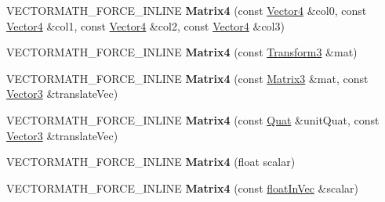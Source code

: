\begin{DoxyCompactItemize}
\item 
\hypertarget{class_vectormath_1_1_aos_1_1_matrix4_af3386f64d6e060f56a9cc5597d634f83}{V\+E\+C\+T\+O\+R\+M\+A\+T\+H\+\_\+\+F\+O\+R\+C\+E\+\_\+\+I\+N\+L\+I\+N\+E {\bfseries Matrix4} (const \hyperlink{class_vectormath_1_1_aos_1_1_vector4}{Vector4} \&col0, const \hyperlink{class_vectormath_1_1_aos_1_1_vector4}{Vector4} \&col1, const \hyperlink{class_vectormath_1_1_aos_1_1_vector4}{Vector4} \&col2, const \hyperlink{class_vectormath_1_1_aos_1_1_vector4}{Vector4} \&col3)}\label{class_vectormath_1_1_aos_1_1_matrix4_af3386f64d6e060f56a9cc5597d634f83}

\item 
\hypertarget{class_vectormath_1_1_aos_1_1_matrix4_a155dbd37559971bfcd30124bf5b66b5b}{V\+E\+C\+T\+O\+R\+M\+A\+T\+H\+\_\+\+F\+O\+R\+C\+E\+\_\+\+I\+N\+L\+I\+N\+E {\bfseries Matrix4} (const \hyperlink{class_vectormath_1_1_aos_1_1_transform3}{Transform3} \&mat)}\label{class_vectormath_1_1_aos_1_1_matrix4_a155dbd37559971bfcd30124bf5b66b5b}

\item 
\hypertarget{class_vectormath_1_1_aos_1_1_matrix4_a136146577c4e69585bde9e17fd7739fd}{V\+E\+C\+T\+O\+R\+M\+A\+T\+H\+\_\+\+F\+O\+R\+C\+E\+\_\+\+I\+N\+L\+I\+N\+E {\bfseries Matrix4} (const \hyperlink{class_vectormath_1_1_aos_1_1_matrix3}{Matrix3} \&mat, const \hyperlink{class_vectormath_1_1_aos_1_1_vector3}{Vector3} \&translate\+Vec)}\label{class_vectormath_1_1_aos_1_1_matrix4_a136146577c4e69585bde9e17fd7739fd}

\item 
\hypertarget{class_vectormath_1_1_aos_1_1_matrix4_ac3baa078bb8fc98ffc65cc32c36c5e6e}{V\+E\+C\+T\+O\+R\+M\+A\+T\+H\+\_\+\+F\+O\+R\+C\+E\+\_\+\+I\+N\+L\+I\+N\+E {\bfseries Matrix4} (const \hyperlink{class_vectormath_1_1_aos_1_1_quat}{Quat} \&unit\+Quat, const \hyperlink{class_vectormath_1_1_aos_1_1_vector3}{Vector3} \&translate\+Vec)}\label{class_vectormath_1_1_aos_1_1_matrix4_ac3baa078bb8fc98ffc65cc32c36c5e6e}

\item 
\hypertarget{class_vectormath_1_1_aos_1_1_matrix4_ab38c1cbd9bacd23df03ac5ed70755d2f}{V\+E\+C\+T\+O\+R\+M\+A\+T\+H\+\_\+\+F\+O\+R\+C\+E\+\_\+\+I\+N\+L\+I\+N\+E {\bfseries Matrix4} (float scalar)}\label{class_vectormath_1_1_aos_1_1_matrix4_ab38c1cbd9bacd23df03ac5ed70755d2f}

\item 
\hypertarget{class_vectormath_1_1_aos_1_1_matrix4_aa60ecfaef86b53ff416286fa73813baa}{V\+E\+C\+T\+O\+R\+M\+A\+T\+H\+\_\+\+F\+O\+R\+C\+E\+\_\+\+I\+N\+L\+I\+N\+E {\bfseries Matrix4} (const \hyperlink{class_vectormath_1_1float_in_vec}{float\+In\+Vec} \&scalar)}\label{class_vectormath_1_1_aos_1_1_matrix4_aa60ecfaef86b53ff416286fa73813baa}


\end{DoxyCompactItemize}
